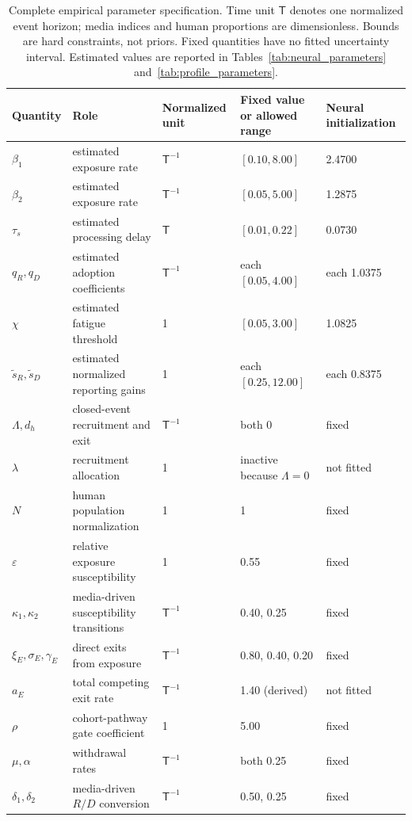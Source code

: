 \begin{table}[t]
\centering\scriptsize
\caption{Complete empirical parameter specification. Time unit $\mathsf T$ denotes one normalized event horizon; media indices and human proportions are dimensionless. Bounds are hard constraints, not priors. Fixed quantities have no fitted uncertainty interval. Estimated values are reported in Tables~\ref{tab:neural_parameters} and~\ref{tab:profile_parameters}.}
\label{tab:empirical_parameters}
\begin{tabular}{lllll}
\toprule Quantity & Role & Normalized unit & Fixed value or allowed range & Neural initialization\\\midrule
$\beta_1$ & estimated exposure rate & $\mathsf T^{-1}$ & $[0.10,8.00]$ & 2.4700\\
$\beta_2$ & estimated exposure rate & $\mathsf T^{-1}$ & $[0.05,5.00]$ & 1.2875\\
$\tau_s$ & estimated processing delay & $\mathsf T$ & $[0.01,0.22]$ & 0.0730\\
$q_R,q_D$ & estimated adoption coefficients & $\mathsf T^{-1}$ & each $[0.05,4.00]$ & each 1.0375\\
$\chi$ & estimated fatigue threshold & 1 & $[0.05,3.00]$ & 1.0825\\
$\widetilde s_R,\widetilde s_D$ & estimated normalized reporting gains & 1 & each $[0.25,12.00]$ & each 0.8375\\\midrule
$\Lambda,d_h$ & closed-event recruitment and exit & $\mathsf T^{-1}$ & both 0 & fixed\\
$\lambda$ & recruitment allocation & 1 & inactive because $\Lambda=0$ & not fitted\\
$N$ & human population normalization & 1 & 1 & fixed\\
$\varepsilon$ & relative exposure susceptibility & 1 & 0.55 & fixed\\
$\kappa_1,\kappa_2$ & media-driven susceptibility transitions & $\mathsf T^{-1}$ & 0.40, 0.25 & fixed\\
$\xi_E,\sigma_E,\gamma_E$ & direct exits from exposure & $\mathsf T^{-1}$ & 0.80, 0.40, 0.20 & fixed\\
$a_E$ & total competing exit rate & $\mathsf T^{-1}$ & 1.40 (derived) & not fitted\\
$\rho$ & cohort-pathway gate coefficient & 1 & 5.00 & fixed\\
$\mu,\alpha$ & withdrawal rates & $\mathsf T^{-1}$ & both 0.25 & fixed\\
$\delta_1,\delta_2$ & media-driven $R/D$ conversion & $\mathsf T^{-1}$ & 0.50, 0.25 & fixed\\

\end{tabular}
\end{table}
